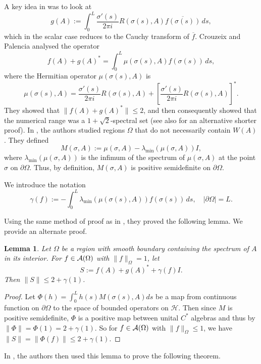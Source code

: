 \documentclass{article}
\newtheorem{Lemma}[Theorem]{Lemma}
\begin{document}
A key idea in \cite{1root2} was to look at
\begin{equation}\label{cauchytransform}
g(A) := \int_0^L \frac{\sigma' (s)}{2 \pi i} R( \sigma (s) , A ) \overline{f( \sigma (s) )}\,ds,
\end{equation}
which in the scalar case reduces to the Cauchy transform of $\overline{f}$.
Crouzeix and Palencia analysed the operator
\[
 f(A) + g(A )^{*} = \int_0^L \mu ( \sigma (s) , A ) f( \sigma (s) )\,ds , 
\]
where the Hermitian operator $\mu ( \sigma (s) , A )$ is
\begin{equation}
\mu ( \sigma (s) , A ) = \frac{\sigma' (s)}{2 \pi i} R( \sigma (s), A ) + \left[ 
\frac{\sigma' (s)}{2 \pi i} R( \sigma (s), A ) \right]^{*} . \label{mu}
\end{equation}
They showed that $\|f(A) + g(A)^*\| \leq 2$, and then consequently showed that the numerical range was a $1 + \sqrt{2}$-spectral set (see also \cite{ransford2018remarks} for an alternative shorter proof). In \cite{CCpalenciaextension}, the authors studied regions $\Omega$
that do not necessarily contain $W(A)$. They defined 
\begin{equation}
M( \sigma , A ) := \mu ( \sigma , A ) - \lambda_{\min} ( \mu ( \sigma , A ) ) I , \label{M}
\end{equation}
where $\lambda_{\min} ( \mu ( \sigma , A ))$ is the infimum of the spectrum of 
$\mu ( \sigma , A )$ at the point $\sigma$ on $\partial \Omega$.  Thus, by definition, 
$M( \sigma , A )$ is positive semidefinite on $\partial \Omega$.

We introduce the notation 
\begin{equation}\label{gamma}
    \gamma(f) := - \int_0^L \lambda_{\min}( \mu ( \sigma (s), A ) ) 
f( \sigma(s) )\,ds , \quad |\partial \Omega| = L .
\end{equation}

Using the same method of proof as in \cite{1root2}, they proved the following lemma. We provide an alternate proof.

\begin{Lemma}\label{mainlemma}
Let $\Omega$ be a region with smooth boundary containing the spectrum of $A$ in its interior.  
For $f \in {\cal A} ( \Omega )$ with $\| f \|_{\Omega} = 1$, let
\begin{equation}
S := f(A) + g(A )^{*} + \gamma(f) I .
\label{S}
\end{equation}
Then $\| S \| \leq 2 + \gamma(1)$.
\end{Lemma}

\begin{proof}

Let $\Phi(h) = \int_0^L h (s) M(\sigma(s),A) ds$ be a map from continuous function on $\partial \Omega$ to the space of bounded operators on $\mathcal{H}$. Then since $M$ is positive semidefinite, $\Phi$ is a positive map between unital $C^*$ algebras and thus by \cite[Chapter 2]{paulsen2002completely} $\|\Phi\| = \Phi(1) = 2+\gamma(1)$. So for $f \in {\cal A} ( \Omega )$ with $\|f\|_{\Omega} \leq 1$, we have $\|S\| = \|\Phi(f)\| \leq 2 + \gamma(1) $.
\end{proof}
\noindent In \cite{CCpalenciaextension}, the authors then used this lemma to prove the following theorem.
\end{document}
